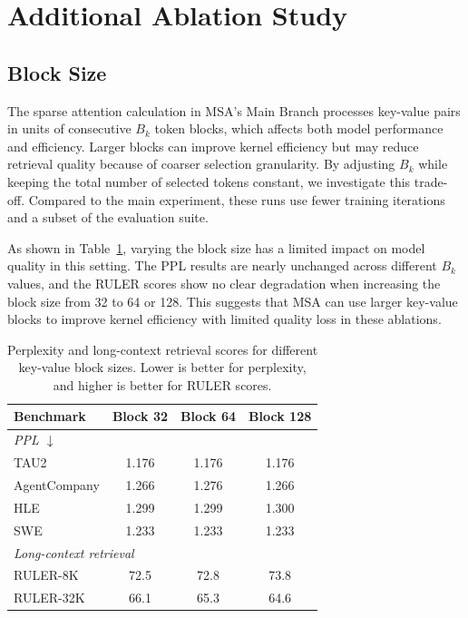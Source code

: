 \documentclass{llmxive}
\providecommand{\method}{\textsc{MSA}}
\begin{document}
\section{Additional Ablation Study}
\label{app:additional-ablation}


\subsection{Block Size}
\label{app:prelim-block-size}

The sparse attention calculation in \method{}'s Main Branch processes key-value pairs in units of consecutive $B_k$ token blocks, which affects both model performance and efficiency. Larger blocks can improve kernel efficiency but may reduce retrieval quality because of coarser selection granularity. By adjusting $B_k$ while keeping the total number of selected tokens constant, we investigate this trade-off. Compared to the main experiment, these runs use fewer training iterations and a subset of the evaluation suite.

As shown in Table~\ref{tab:block-ablation}, varying the block size has a limited impact on model quality in this setting. The PPL results are nearly unchanged across different $B_k$ values, and the RULER scores show no clear degradation when increasing the block size from 32 to 64 or 128. This suggests that \method{} can use larger key-value blocks to improve kernel efficiency with limited quality loss in these ablations.

\begin{table}[!htb]
\centering
\small
\begin{tabular}{l c c c}
\toprule
Benchmark & Block 32 & Block 64 & Block 128 \\
\midrule
\multicolumn{4}{l}{\textit{PPL $\downarrow$}} \\
TAU2                             & 1.176 & 1.176 & 1.176 \\
AgentCompany                     & 1.266 & 1.276 & 1.266 \\
HLE                              & 1.299 & 1.299 & 1.300 \\
SWE                              & 1.233 & 1.233 & 1.233 \\
\midrule
\multicolumn{4}{l}{\textit{Long-context retrieval}} \\
RULER-8K                          & 72.5 & 72.8 & 73.8 \\
RULER-32K                          & 66.1 & 65.3 & 64.6 \\
\bottomrule
\end{tabular}
\caption{Perplexity and long-context retrieval scores for different
key-value block sizes. Lower is better for perplexity, and higher is
better for RULER scores.}
\label{tab:block-ablation}
\end{table}
\end{document}
